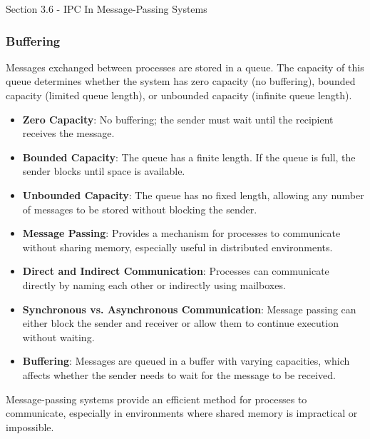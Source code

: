 \begin{notes}{Section 3.6 - IPC In Message-Passing Systems}
\begin{highlight}
    \end{highlight}
    
    \subsubsection*{Buffering}
    
    Messages exchanged between processes are stored in a queue. The capacity of this queue determines whether the system has zero capacity (no buffering), bounded capacity (limited queue length), or 
    unbounded capacity (infinite queue length).
    
    \begin{highlight}[Buffering]
    
        \begin{itemize}
            \item \textbf{Zero Capacity}: No buffering; the sender must wait until the recipient receives the message.
            \item \textbf{Bounded Capacity}: The queue has a finite length. If the queue is full, the sender blocks until space is available.
            \item \textbf{Unbounded Capacity}: The queue has no fixed length, allowing any number of messages to be stored without blocking the sender.
        \end{itemize}
    
    \end{highlight}
    
    \begin{highlight}
    
        \begin{itemize}
            \item \textbf{Message Passing}: Provides a mechanism for processes to communicate without sharing memory, especially useful in distributed environments.
            \item \textbf{Direct and Indirect Communication}: Processes can communicate directly by naming each other or indirectly using mailboxes.
            \item \textbf{Synchronous vs. Asynchronous Communication}: Message passing can either block the sender and receiver or allow them to continue execution without waiting.
            \item \textbf{Buffering}: Messages are queued in a buffer with varying capacities, which affects whether the sender needs to wait for the message to be received.
        \end{itemize}
    
    Message-passing systems provide an efficient method for processes to communicate, especially in environments where shared memory is impractical or impossible.
    
    \end{highlight}
\end{notes}

